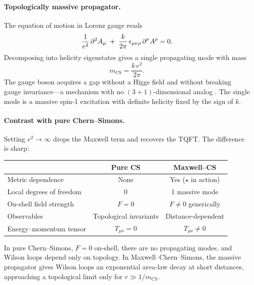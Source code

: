 \paragraph{Topologically massive propagator.}
The equation of motion in Lorenz gauge reads
\begin{equation}
  \frac{1}{e^{2}}\,\partial^{2}A_\mu
  \;+\;
  \frac{k}{2\pi}\,\epsilon_{\mu\nu\rho}\,\partial^{\nu}A^{\rho}
  = 0.
  \label{eq:mcs-eom}
\end{equation}
Decomposing into helicity eigenstates gives a single propagating mode with mass
\begin{equation}
  m_{\mathrm{CS}} = \frac{k\,e^{2}}{2\pi}.
  \label{eq:topological-mass}
\end{equation}
The gauge boson acquires a gap without a Higgs field and without breaking gauge invariance---a mechanism with no $(3{+}1)$-dimensional analog \cite{Dunne1999AspectsCS}. The single mode is a massive spin-1 excitation with definite helicity fixed by the sign of $k$.

\paragraph{Contrast with pure Chern--Simons.}
Setting $e^{2}\to\infty$ drops the Maxwell term and recovers the TQFT. The difference is sharp:
\begin{center}
\renewcommand{\arraystretch}{1.3}
\begin{tabular}{lcc}
  & \textbf{Pure CS} & \textbf{Maxwell--CS} \\
\hline
Metric dependence & None & Yes ($\star$ in action) \\
Local degrees of freedom & 0 & 1 massive mode \\
On-shell field strength & $F = 0$ & $F\neq 0$ generically \\
Observables & Topological invariants & Distance-dependent \\
Energy--momentum tensor & $T_{\mu\nu}=0$ & $T_{\mu\nu}\neq 0$
\end{tabular}
\end{center}
In pure Chern--Simons, $F=0$ on-shell, there are no propagating modes, and Wilson loops depend only on topology. In Maxwell--Chern--Simons, the massive propagator gives Wilson loops an exponential area-law decay at short distances, approaching a topological limit only for $r \gg 1/m_{\mathrm{CS}}$.

